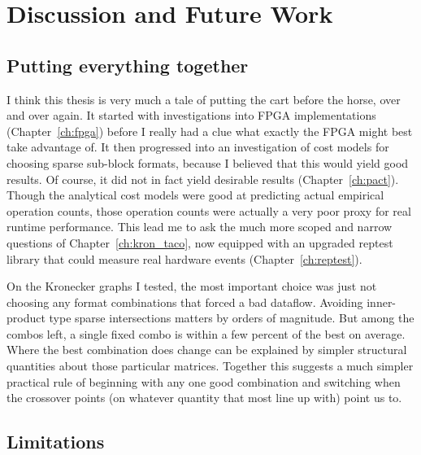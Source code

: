 \chapter{Discussion and Future Work}

\section{Putting everything together}
I think this thesis is very much a tale of putting the cart before the horse, over and over again. It started with investigations into FPGA implementations
(Chapter~\ref{ch:fpga}) before I really had a clue what exactly the FPGA might best take advantage of. It then progressed into an investigation of cost models for choosing sparse sub-block formats, because I believed that this would yield good results. Of course, it did not in fact yield desirable results (Chapter~\ref{ch:pact}). Though the analytical cost models were good at predicting actual empirical operation counts, those operation counts were actually a very poor proxy for real runtime performance. This lead me to ask the much more scoped and narrow questions of Chapter~\ref{ch:kron_taco}, now equipped with an upgraded reptest library that could measure real hardware events (Chapter~\ref{ch:reptest}).

On the Kronecker graphs I tested, the most important choice was just not choosing any format combinations that forced a bad dataflow. Avoiding inner-product type sparse intersections matters by orders of magnitude. But among the combos left, a single fixed combo is within a few percent of the best on average. Where the best combination does change can be explained by simpler structural quantities about those particular matrices. Together this suggests a much simpler practical rule of beginning with any one good combination and switching when the crossover points (on whatever quantity that most line up with) point us to.

\section{Limitations}

